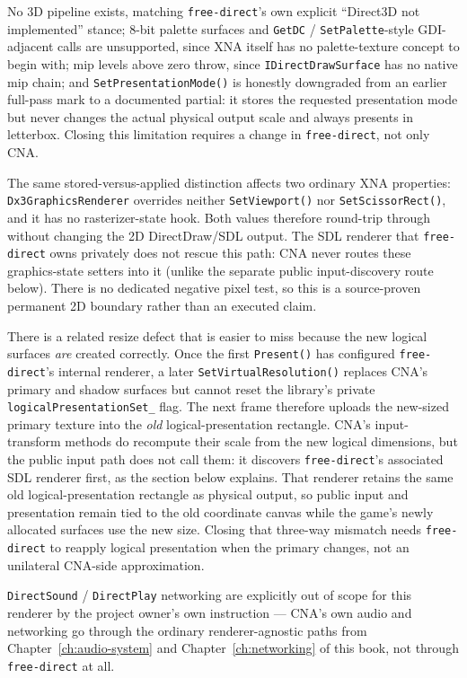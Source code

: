 No 3D pipeline exists, matching \texttt{free-direct}'s own explicit ``Direct3D not
implemented'' stance; 8-bit palette surfaces and \texttt{GetDC} / \texttt{SetPalette}-style
GDI-adjacent calls are unsupported, since XNA itself has no palette-texture concept to begin
with; mip levels above zero throw, since \texttt{IDirectDrawSurface} has no native mip chain;
and \texttt{SetPresentationMode()} is honestly downgraded from an earlier full-pass mark to a documented
partial: it stores the requested presentation mode but never changes the actual physical
output scale and always presents in letterbox. Closing this limitation requires a change in
\texttt{free-direct}, not only CNA.

The same stored-versus-applied distinction affects two ordinary XNA properties:
\texttt{Dx3Graphics}\allowbreak\texttt{Renderer} overrides neither \texttt{SetViewport()} nor
\texttt{SetScissorRect()}, and it has no rasterizer-state hook. Both values therefore
round-trip through  without changing the 2D DirectDraw/SDL output.
The SDL renderer that \texttt{free-direct} owns privately does not rescue this path: CNA never
routes these graphics-state setters into it (unlike the separate public input-discovery route
below). There is no dedicated negative pixel test, so this is a source-proven permanent 2D
boundary rather than an executed claim.

There is a related resize defect that is easier to miss because the new logical surfaces
\emph{are} created correctly. Once the first \texttt{Present()} has configured
\texttt{free-direct}'s internal renderer, a later \texttt{SetVirtualResolution()} replaces CNA's
primary and shadow surfaces but cannot reset the library's private
\texttt{logicalPresentationSet\_} flag. The next frame therefore uploads the new-sized primary
texture into the \emph{old} logical-presentation rectangle. CNA's input-transform methods
do recompute their scale from the new logical dimensions, but the public input path does not
call them: it discovers \texttt{free-direct}'s associated SDL renderer first, as the section
below explains. That renderer retains the same old logical-presentation rectangle as physical
output, so public input and presentation remain tied to the old coordinate canvas while the
game's newly allocated surfaces use the new size. Closing that three-way mismatch needs
\texttt{free-direct} to reapply logical presentation when the primary changes, not an
unilateral CNA-side approximation.

\texttt{DirectSound} / \texttt{DirectPlay} networking are explicitly out
of scope for this renderer by the project owner's own instruction --- CNA's own audio and
networking go through the ordinary renderer-agnostic paths from Chapter~\ref{ch:audio-system}
and Chapter~\ref{ch:networking} of this book, not through \texttt{free-direct} at all.

